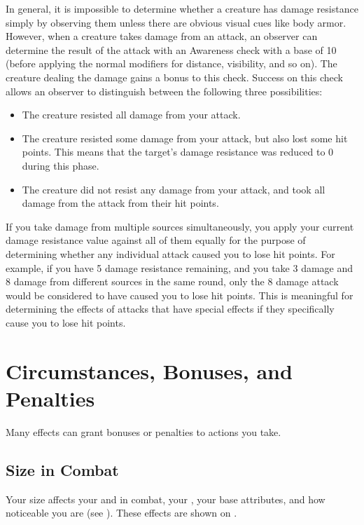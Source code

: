        In general, it is impossible to determine whether a creature has damage resistance simply by observing them unless there are obvious visual cues like body armor.
        However, when a creature takes damage from an attack, an observer can determine the result of the attack with an Awareness check with a base  of 10 (before applying the normal modifiers for distance, visibility, and so on).
        The creature dealing the damage gains a  bonus to this check.
        Success on this check allows an observer to distinguish between the following three possibilities:
        \begin{itemize}
            \item The creature resisted all damage from your attack.
            \item The creature resisted some damage from your attack, but also lost some hit points.
                This means that the target's damage resistance was reduced to 0 during this phase.
            \item The creature did not resist any damage from your attack, and took all damage from the attack from their hit points.
        \end{itemize}

         If you take damage from multiple sources simultaneously, you apply your current damage resistance value against all of them equally for the purpose of determining whether any individual attack caused you to lose hit points.
        For example, if you have 5 damage resistance remaining, and you take 3 damage and 8 damage from different sources in the same round, only the 8 damage attack would be considered to have caused you to lose hit points.
        This is meaningful for determining the effects of attacks that have special effects if they specifically cause you to lose hit points.

\section{Circumstances, Bonuses, and Penalties}

    Many effects can grant bonuses or penalties to actions you take.

    \subsection{Size in Combat}\label{Size in Combat}
        Your size affects your  and  in combat, your , your base attributes, and how noticeable you are (see ).
        These effects are shown on .

